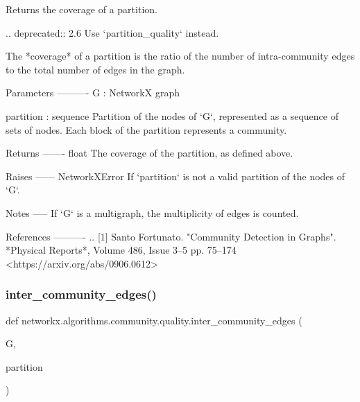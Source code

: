 \begin{DoxyVerb}Returns the coverage of a partition.

.. deprecated:: 2.6
   Use `partition_quality` instead.

The *coverage* of a partition is the ratio of the number of
intra-community edges to the total number of edges in the graph.

Parameters
----------
G : NetworkX graph

partition : sequence
    Partition of the nodes of `G`, represented as a sequence of
    sets of nodes. Each block of the partition represents a
    community.

Returns
-------
float
    The coverage of the partition, as defined above.

Raises
------
NetworkXError
    If `partition` is not a valid partition of the nodes of `G`.

Notes
-----
If `G` is a multigraph, the multiplicity of edges is counted.

References
----------
.. [1] Santo Fortunato.
       "Community Detection in Graphs".
       *Physical Reports*, Volume 486, Issue 3--5 pp. 75--174
       <https://arxiv.org/abs/0906.0612>\end{DoxyVerb}
 \mbox{\label{namespacenetworkx_1_1algorithms_1_1community_1_1quality_ade6588f07c2e51d6bb373430c4ad4505}} 
\subsubsection{\texorpdfstring{inter\+\_\+community\+\_\+edges()}{inter\_community\_edges()}}
{\footnotesize\ttfamily def networkx.\+algorithms.\+community.\+quality.\+inter\+\_\+community\+\_\+edges (\begin{DoxyParamCaption}\item[{}]{G,  }\item[{}]{partition }\end{DoxyParamCaption})}

